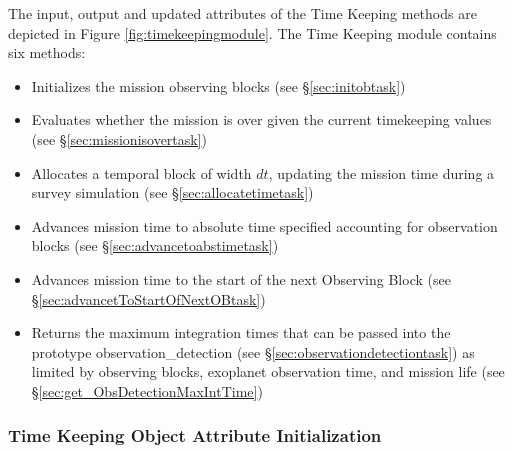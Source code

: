 \documentclass[cleanfoot]{asme2ej}
\newcommand{\reffig}[1]{Figure \ref{#1}}
\begin{document}
The input, output and updated attributes of the Time Keeping methods are depicted in \reffig{fig:timekeepingmodule}. The Time Keeping module contains six methods:
\begin{itemize}[leftmargin=1.5in,font={\ttfamily}]
    \item[\texttt init\_OB] Initializes the mission observing blocks (see \S\ref{sec:initobtask})
    \item[\texttt mission\_is\_over] Evaluates whether the mission is over given the current timekeeping values (see \S\ref{sec:missionisovertask})
    \item[\texttt allocate\_time] Allocates a temporal block of width $dt$, updating the mission time during a survey simulation (see \S\ref{sec:allocatetimetask})
    \item[\texttt advanceToAbsTime] Advances mission time to absolute time specified accounting for observation blocks (see \S\ref{sec:advancetoabstimetask})
    \item[\texttt advancetToStartOfNextOB] Advances mission time to the start of the next Observing Block (see \S\ref{sec:advancetToStartOfNextOBtask})
    \item[\texttt get\_ObsDetectionMaxIntTime] Returns the maximum integration times that can be passed into the prototype observation\_detection (see \S\ref{sec:observationdetectiontask}) as limited by observing blocks, exoplanet observation time, and mission life (see \S\ref{sec:get_ObsDetectionMaxIntTime})
\end{itemize}


\subsubsection{Time Keeping Object Attribute Initialization}
\end{document}

